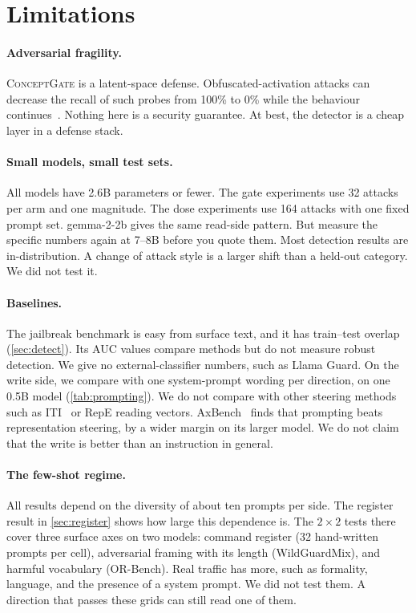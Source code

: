 \documentclass[11pt]{article}
\newcommand{\cg}{\textsc{ConceptGate}}
\begin{document}
\section{Limitations}
\label{sec:limits}

\paragraph{Adversarial fragility.} \cg{} is a latent-space defense. Obfuscated-activation attacks can decrease the recall of such probes from 100\% to 0\% while the behaviour continues~\citep{bailey2024obfuscated}.
Nothing here is a security guarantee. At best, the detector is a cheap layer in a defense stack.

\paragraph{Small models, small test sets.} All models have 2.6B parameters or fewer. The gate experiments
use 32 attacks per arm and one magnitude. The dose experiments use 164 attacks with one fixed prompt set.
gemma-2-2b gives the same read-side pattern. But measure the specific numbers again at 7--8B before you quote
them. Most detection results are in-distribution. A change of attack style is a larger shift than a
held-out category. We did not test it.

\paragraph{Baselines.} The jailbreak benchmark is easy from surface text, and it has train--test overlap
(\cref{sec:detect}). Its AUC values compare methods but do not measure robust detection. We give no
external-classifier numbers, such as Llama Guard. On the write side, we compare with one system-prompt
wording per direction, on one 0.5B model (\cref{tab:prompting}). We do not compare with other steering
methods such as ITI~\citep{li2023iti} or RepE reading vectors. AxBench~\citep{wu2025axbench} finds that prompting beats representation steering, by a wider margin on its larger model. We do not claim that the write is better than an instruction in general.

\paragraph{The few-shot regime.} All results depend on the diversity of about ten prompts per side. The
register result in \cref{sec:register} shows how large this dependence is. The $2\times2$ tests there cover
three surface axes on two models: command register (32 hand-written prompts per cell), adversarial framing
with its length (WildGuardMix), and harmful vocabulary (OR-Bench). Real traffic has more, such as
formality, language, and the presence of a system prompt. We did not test them. A direction that passes
these grids can still read one of them.
\end{document}
